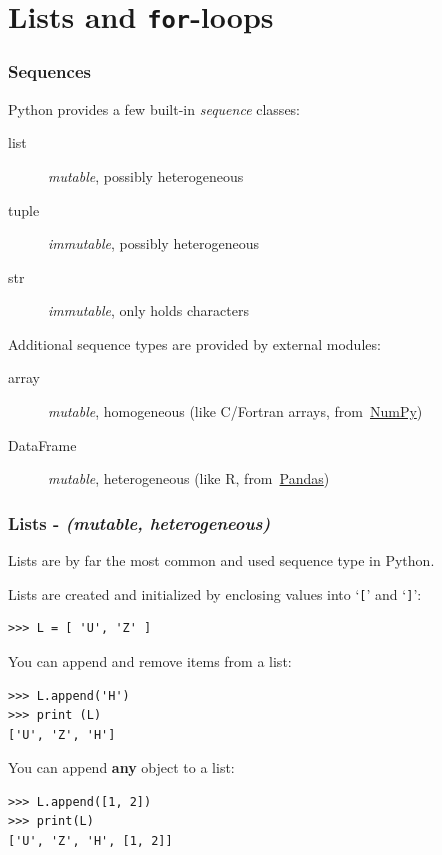 \documentclass[english,serif,mathserif,xcolor=pdftex,dvipsnames,table]{beamer}
\begin{document}
\section{Lists and \texttt{for}-loops}

\begin{frame}
  \frametitle{Sequences}

  Python provides a few built-in \emph{sequence} classes:
  \begin{description}
  \item[list] \emph{mutable}, possibly heterogeneous
  \item[tuple] \emph{immutable}, possibly heterogeneous
  \item[str] \emph{immutable}, only holds characters
  \end{description}

  \+
  Additional sequence types are provided by external modules:
  \begin{description}
  \item[array] \emph{mutable}, homogeneous (like C/Fortran arrays,
    from~\href{http://numpy.scipy.org}{NumPy})
  \item[DataFrame] \emph{mutable}, heterogeneous (like R,
    from~\href{http://pandas.pydata.org/}{Pandas})
  \end{description}

\end{frame}


\begin{frame}[fragile]
  \frametitle{Lists - \textit{(mutable, heterogeneous)}}
  Lists are by far the most common and used sequence type in Python.

  \+
  Lists are created and initialized by enclosing values into
  `\texttt{[}' and `\texttt{]}':
\begin{lstlisting}
>>> L = [ 'U', 'Z' ]
\end{lstlisting}

  \+\pause
  You can append and remove items from a list:
\begin{lstlisting}
>>> L.append('H')
>>> print (L)
['U', 'Z', 'H']
\end{lstlisting}

  \+\pause
  You can append \textbf{any} object to a list:
\begin{lstlisting}
>>> L.append([1, 2])
>>> print(L)
['U', 'Z', 'H', [1, 2]]
\end{lstlisting}

\end{frame}
\end{document}
